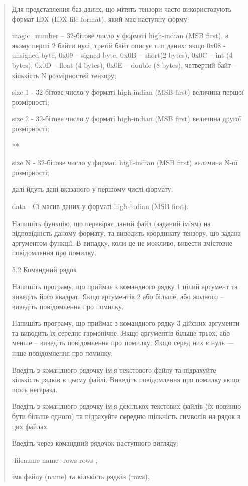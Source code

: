 \documentclass[]{article}
\begin{document}
\begin{quote}
Для представлення баз даних, що мітять тензори часто використовують
формат IDX (IDX file format), який має наступну форму:

magic\_number -- 32-бітове число у форматі high-indian (MSB first), в
якому перші 2 байти нулі, третій байт описує тип даних: якщо 0x08
-unsigned byte, 0x09 -- signed byte, 0x0B -- short(2 bytes), 0x0C -- int
(4 bytes), 0x0D -- float (4 bytes), 0x0E -- double (8 bytes), четвертий
байт -- кількість N розмірностей тензору;

size 1 - 32-бітове число у форматі high-indian (MSB first) величина
першої розмірності;

size 2 - 32-бітове число у форматі high-indian (MSB first) величина
другої розмірності;

**

size N - 32-бітове число у форматі high-indian (MSB first) величина N-ої
розмірності;

далі йдуть дані вказаного у першому числі формату:

data - Cі-масив даних у форматі high-indian (MSB first).

Напишіть функцію, що перевіряє даний файл (заданий ім'ям) на
відповідність даному формату, та виводить координату тензору, що задана
аргументом функції. В випадку, коли це не можливо, вивести змістовне
повідомлення про помилку.

5.2 Командний рядок

Напишіть програму, що приймає з командного рядку 1 цілий аргумент та
виведіть його квадрат. Якщо аргументів 2 або більше, або жодного --
виведіть повідомлення про помилку.

Напишіть програму, що приймає з командного рядку 3 дійсних аргументи та
виводить їх середнє гармонічне. Якщо аргументів більше трьох, або менше
-- виведіть повідомлення про помилку. Якщо серед них є нуль --- інше
повідомлення про помилку.

Введіть з командного рядочку ім'я текстового файлу та підрахуйте
кількість рядків в цьому файлі. Виведіть повідомлення про помилку якщо
щось негаразд.

Введіть з командного рядочку ім'я декількох текстових файлів (їх повинно
бути більше одного) та підрахуйте середню щільність символів на рядок в
цих файлах.

Введіть через командний рядочок наступного вигляду:

-filename name -rows rows ,

імя файлу (name) та кількість рядків (rows),


\end{quote}
\end{document}
